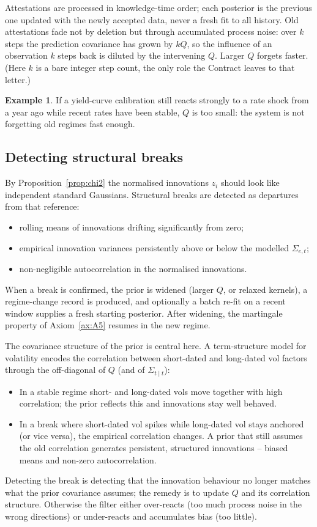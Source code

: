 \documentclass[11pt]{book}
\theoremstyle{plain}
\theoremstyle{definition}
\newtheorem{example}[theorem]{Example}
\theoremstyle{remark}
\begin{document}
Attestations are processed in knowledge-time order; each posterior is the previous
one updated with the newly accepted data, never a fresh fit to all history. Old
attestations fade not by deletion but through accumulated process noise: over $k$
steps the prediction covariance has grown by $kQ$, so the influence of an
observation $k$ steps back is diluted by the intervening $Q$. Larger $Q$ forgets
faster. (Here $k$ is a bare integer step count, the only role the Contract leaves
to that letter.)

\begin{example}
If a yield-curve calibration still reacts strongly to a rate shock from a year ago
while recent rates have been stable, $Q$ is too small: the system is not
forgetting old regimes fast enough.
\end{example}

\subsection{Detecting structural breaks}

By Proposition~\ref{prop:chi2} the normalised innovations $z_i$ should look like
independent standard Gaussians. Structural breaks are detected as departures from
that reference:
\begin{itemize}[nosep]
    \item rolling means of innovations drifting significantly from zero;
    \item empirical innovation variances persistently above or below the modelled
        $\Sigma_{e,t}$;
    \item non-negligible autocorrelation in the normalised innovations.
\end{itemize}
When a break is confirmed, the prior is widened (larger $Q$, or relaxed kernels),
a regime-change record is produced, and optionally a batch re-fit on a recent
window supplies a fresh starting posterior. After widening, the martingale
property of Axiom~\ref{ax:A5} resumes in the new regime.

The covariance structure of the prior is central here. A term-structure model for
volatility encodes the correlation between short-dated and long-dated vol
factors through the off-diagonal of $Q$ (and of $\Sigma_{t\mid t}$):
\begin{itemize}[nosep]
    \item In a stable regime short- and long-dated vols move together with high
        correlation; the prior reflects this and innovations stay well behaved.
    \item In a break where short-dated vol spikes while long-dated vol stays
        anchored (or vice versa), the empirical correlation changes. A prior that
        still assumes the old correlation generates persistent, structured
        innovations -- biased means and non-zero autocorrelation.
\end{itemize}
Detecting the break is detecting that the innovation behaviour no longer matches
what the prior covariance assumes; the remedy is to update $Q$ and its
correlation structure. Otherwise the filter either over-reacts (too much process
noise in the wrong directions) or under-reacts and accumulates bias (too little).
\end{document}
